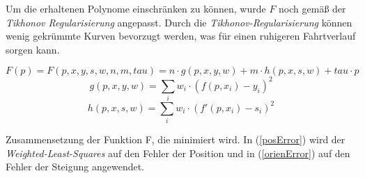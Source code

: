 Um die erhaltenen Polynome einschränken zu können, wurde $F$ noch gemäß der \textit{Tikhonov Regularisierung} \cite{kaipio2006statistical} angepasst. Durch die \textit{Tikhonov-Regularisierung} können wenig gekrümmte Kurven bevorzugt werden, was für einen ruhigeren Fahrtverlauf sorgen kann.
\begin{ownequation}[H]
\begin{equation}
\label{minimizeFunction}
F(p) = F(p,x,y,s,w,n,m,tau) = n \cdot g(p,x,y,w) + m \cdot h(p,x,s,w) + tau \cdot p
\end{equation}
\begin{equation}
\label{posError}
g(p,x,y,w) = \sum_{i} w_i \cdot (f(p,x_i)-y_i)^2
\end{equation}
\begin{equation}
\label{orienError}
h(p,x,s,w) = \sum_{i} w_i \cdot (f'(p,x_i)-s_i)^2
\end{equation}
\caption{Zusammensetzung der Funktion F, die minimiert wird. In (\ref{posError}) wird der \textit{Weighted-Least-Squares} auf den Fehler der Position und in (\ref{orienError}) auf den Fehler der Steigung angewendet.}
\label{F-function}
\end{ownequation}

